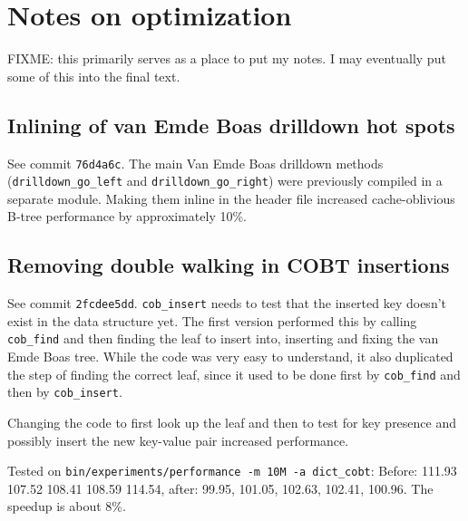 \section{Notes on optimization}
FIXME: this primarily serves as a place to put my notes.
I may eventually put some of this into the final text.

\subsection{Inlining of van Emde Boas drilldown hot spots}
See commit \texttt{76d4a6c}. The main Van Emde Boas drilldown
methods (\texttt{drilldown\_go\_left} and \texttt{drilldown\_go\_right})
were previously compiled in a separate module. Making them inline
in the header file increased cache-oblivious B-tree performance
by approximately 10\%.

\subsection{Removing double walking in COBT insertions}
See commit \texttt{2fcdee5dd}.
\texttt{cob\_insert} needs to test that the inserted key doesn't exist
in the data structure yet. The first version performed this by calling
\texttt{cob\_find} and then finding the leaf to insert into, inserting
and fixing the van Emde Boas tree. While the code was very easy to understand,
it also duplicated the step of finding the correct leaf, since it used
to be done first by \texttt{cob\_find} and then by \texttt{cob\_insert}.

Changing the code to first look up the leaf and then to test for key presence
and possibly insert the new key-value pair increased performance.

Tested on \texttt{bin/experiments/performance -m 10M -a dict\_cobt}:
Before: 111.93 107.52 108.41 108.59 114.54, after:
99.95, 101.05, 102.63, 102.41, 100.96.
The speedup is about 8\%.
